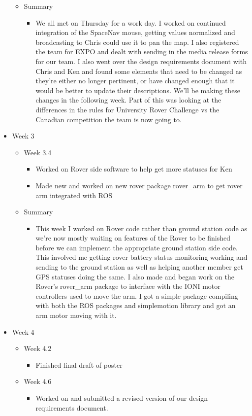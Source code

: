 \begin{itemize}
\begin{itemize}
    \item Summary
      \begin{itemize}
      \item We all met on Thursday for a work day. I worked on continued integration of the SpaceNav mouse, getting values normalized and broadcasting to Chris could use it to pan the map. I also registered the team for EXPO and dealt with sending in the media release forms for our team. I also went over the design requirements document with Chris and Ken and found some elements that need to be changed as they're either no longer pertinent, or have changed enough that it would be better to update their descriptions. We'll be making these changes in the following week. Part of this was looking at the differences in the rules for University Rover Challenge vs the Canadian competition the team is now going to.  
      \end{itemize}
	\end{itemize}

\item Week 3
	\begin{itemize}
	\item Week 3.4
      \begin{itemize}
      \item Worked on Rover side software to help get more statuses for Ken 
      \item Made new and worked on new rover package rover\_arm to get rover arm integrated with ROS 
      \end{itemize}
    
    \item Summary
      \begin{itemize}
      \item This week I worked on Rover code rather than ground station code as we're now mostly waiting on features of the Rover to be finished before we can implement the appropriate ground station side code. This involved me getting rover battery status monitoring working and sending to the ground station as well as helping another member get GPS statuses doing the same. I also made and began work on the Rover's rover\_arm package to interface with the IONI motor controllers used to move the arm. I got a simple package compiling with both the ROS packages and simplemotion library and got an arm motor moving with it. 
      \end{itemize}
	\end{itemize}

\item Week 4
	\begin{itemize}
	\item Week 4.2
      \begin{itemize}
      \item Finished final draft of poster 
      \end{itemize}
	\item Week 4.6
      \begin{itemize}
      \item Worked on and submitted a revised version of our design requirements document. 
      \end{itemize}
    

\end{itemize}
\end{itemize}
